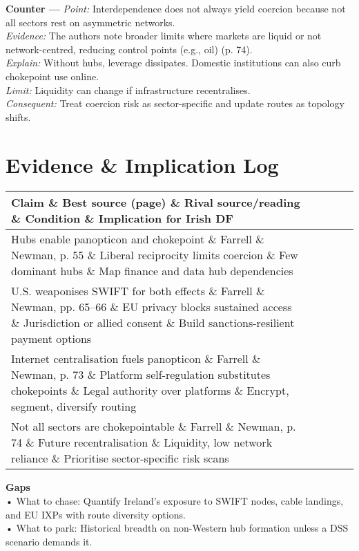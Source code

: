 \textbf{Counter —} \textit{Point:} Interdependence does not always yield coercion because not all sectors rest on asymmetric networks.\\
\textit{Evidence:} The authors note broader limits where markets are liquid or not network-centred, reducing control points (e.g., oil) (p. 74).\\
\textit{Explain:} Without hubs, leverage dissipates. Domestic institutions can also curb chokepoint use online.\\
\textit{Limit:} Liquidity can change if infrastructure recentralises.\\
\textit{Consequent:} Treat coercion risk as sector-specific and update routes as topology shifts.

\section*{Evidence \& Implication Log}
\begin{tabular}{p{3.2cm}p{4.2cm}p{3.6cm}p{3.2cm}p{4.2cm}}
	\textbf{Claim} \& \textbf{Best source (page)} \& \textbf{Rival source/reading} \& \textbf{Condition} \& \textbf{Implication for Irish DF}\\\hline
	Hubs enable panopticon and chokepoint \& Farrell \& Newman, p. 55 \& Liberal reciprocity limits coercion \& Few dominant hubs \& Map finance and data hub dependencies\\
	U.S. weaponises SWIFT for both effects \& Farrell \& Newman, pp. 65–66 \& EU privacy blocks sustained access \& Jurisdiction or allied consent \& Build sanctions-resilient payment options\\
	Internet centralisation fuels panopticon \& Farrell \& Newman, p. 73 \& Platform self-regulation substitutes chokepoints \& Legal authority over platforms \& Encrypt, segment, diversify routing\\
	Not all sectors are chokepointable \& Farrell \& Newman, p. 74 \& Future recentralisation \& Liquidity, low network reliance \& Prioritise sector-specific risk scans\\\hline
\end{tabular}

\textbf{Gaps}\\
• What to chase: Quantify Ireland’s exposure to SWIFT nodes, cable landings, and EU IXPs with route diversity options.\\
• What to park: Historical breadth on non-Western hub formation unless a DSS scenario demands it.

\parencite{EU_2019}

